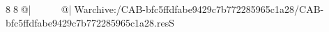 8  8  @|                                                   @| W   archive:/CAB-bfc5ffdfabe9429c7b772285965c1a28/CAB-bfc5ffdfabe9429c7b772285965c1a28.resS 